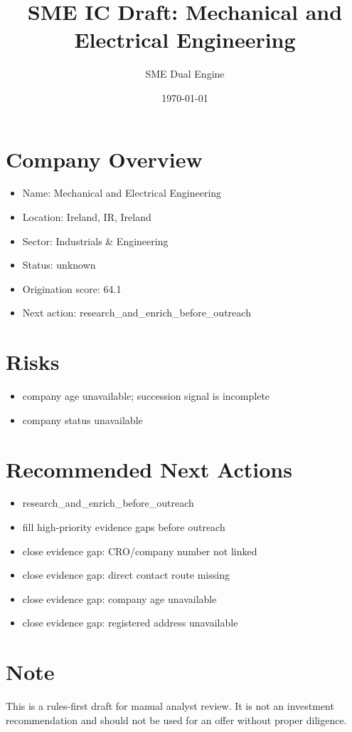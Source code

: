 \documentclass[11pt,a4paper]{article}
\title{SME IC Draft: Mechanical and Electrical Engineering}
\author{SME Dual Engine}
\date{\today}
\begin{document}
\maketitle
\section*{Company Overview}
\begin{itemize}[leftmargin=1.4em]
\item Name: Mechanical and Electrical Engineering
\item Location: Ireland, IR, Ireland
\item Sector: Industrials \& Engineering
\item Status: unknown
\item Origination score: 64.1
\item Next action: research\_and\_enrich\_before\_outreach
\end{itemize}
\section*{Risks}
\begin{itemize}[leftmargin=1.4em]
\item company age unavailable; succession signal is incomplete
\item company status unavailable
\end{itemize}
\section*{Recommended Next Actions}
\begin{itemize}[leftmargin=1.4em]
\item research\_and\_enrich\_before\_outreach
\item fill high-priority evidence gaps before outreach
\item close evidence gap: CRO/company number not linked
\item close evidence gap: direct contact route missing
\item close evidence gap: company age unavailable
\item close evidence gap: registered address unavailable
\end{itemize}
\section*{Note}
This is a rules-first draft for manual analyst review. It is not an investment
recommendation and should not be used for an offer without proper diligence.
\end{document}
